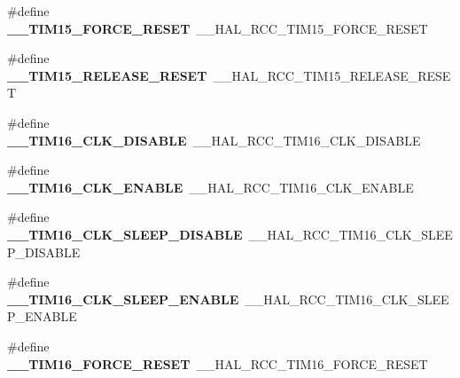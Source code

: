 \begin{DoxyCompactItemize}
\mbox{\label{group___h_a_l___r_c_c___aliased_ga03c43f6aa09a714c4d091331110a209a}} 
\#define {\bfseries \+\_\+\+\_\+\+T\+I\+M15\+\_\+\+F\+O\+R\+C\+E\+\_\+\+R\+E\+S\+ET}~\+\_\+\+\_\+\+H\+A\+L\+\_\+\+R\+C\+C\+\_\+\+T\+I\+M15\+\_\+\+F\+O\+R\+C\+E\+\_\+\+R\+E\+S\+ET
\item 
\mbox{\label{group___h_a_l___r_c_c___aliased_ga1b9c6bc76d9ee78a55710eb7773a2bbc}} 
\#define {\bfseries \+\_\+\+\_\+\+T\+I\+M15\+\_\+\+R\+E\+L\+E\+A\+S\+E\+\_\+\+R\+E\+S\+ET}~\+\_\+\+\_\+\+H\+A\+L\+\_\+\+R\+C\+C\+\_\+\+T\+I\+M15\+\_\+\+R\+E\+L\+E\+A\+S\+E\+\_\+\+R\+E\+S\+ET
\item 
\mbox{\label{group___h_a_l___r_c_c___aliased_ga20a13035ec7902e5ca5fdf878cb51ec3}} 
\#define {\bfseries \+\_\+\+\_\+\+T\+I\+M16\+\_\+\+C\+L\+K\+\_\+\+D\+I\+S\+A\+B\+LE}~\+\_\+\+\_\+\+H\+A\+L\+\_\+\+R\+C\+C\+\_\+\+T\+I\+M16\+\_\+\+C\+L\+K\+\_\+\+D\+I\+S\+A\+B\+LE
\item 
\mbox{\label{group___h_a_l___r_c_c___aliased_ga9dc682b745cf3b2bb955bcc5feb4bcd3}} 
\#define {\bfseries \+\_\+\+\_\+\+T\+I\+M16\+\_\+\+C\+L\+K\+\_\+\+E\+N\+A\+B\+LE}~\+\_\+\+\_\+\+H\+A\+L\+\_\+\+R\+C\+C\+\_\+\+T\+I\+M16\+\_\+\+C\+L\+K\+\_\+\+E\+N\+A\+B\+LE
\item 
\mbox{\label{group___h_a_l___r_c_c___aliased_ga95b0b3e155fea0b19e66b5d38f4a3810}} 
\#define {\bfseries \+\_\+\+\_\+\+T\+I\+M16\+\_\+\+C\+L\+K\+\_\+\+S\+L\+E\+E\+P\+\_\+\+D\+I\+S\+A\+B\+LE}~\+\_\+\+\_\+\+H\+A\+L\+\_\+\+R\+C\+C\+\_\+\+T\+I\+M16\+\_\+\+C\+L\+K\+\_\+\+S\+L\+E\+E\+P\+\_\+\+D\+I\+S\+A\+B\+LE
\item 
\mbox{\label{group___h_a_l___r_c_c___aliased_gade54c71fcbd16e23c401a6f219df9eaf}} 
\#define {\bfseries \+\_\+\+\_\+\+T\+I\+M16\+\_\+\+C\+L\+K\+\_\+\+S\+L\+E\+E\+P\+\_\+\+E\+N\+A\+B\+LE}~\+\_\+\+\_\+\+H\+A\+L\+\_\+\+R\+C\+C\+\_\+\+T\+I\+M16\+\_\+\+C\+L\+K\+\_\+\+S\+L\+E\+E\+P\+\_\+\+E\+N\+A\+B\+LE
\item 
\mbox{\label{group___h_a_l___r_c_c___aliased_ga0e1e4dcad1f5857030a9a6aec4ba4750}} 
\#define {\bfseries \+\_\+\+\_\+\+T\+I\+M16\+\_\+\+F\+O\+R\+C\+E\+\_\+\+R\+E\+S\+ET}~\+\_\+\+\_\+\+H\+A\+L\+\_\+\+R\+C\+C\+\_\+\+T\+I\+M16\+\_\+\+F\+O\+R\+C\+E\+\_\+\+R\+E\+S\+ET

\end{DoxyCompactItemize}

